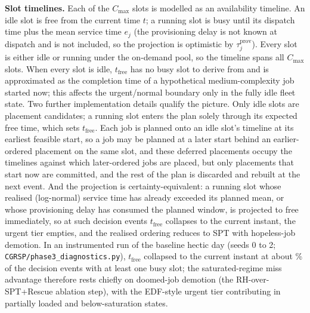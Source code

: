 \textbf{Slot timelines.} Each of the $C_{\max}$ slots is modelled as an availability timeline. An idle slot is free from the current time $t$; a running slot is busy until its dispatch time plus the mean service time $e_j$ (the provisioning delay is not known at dispatch and is not included, so the projection is optimistic by $\tau^{\text{prov}}_j$). Every slot is either idle or running under the on-demand pool, so the timeline spans all $C_{\max}$ slots. When every slot is idle, $t_{\text{free}}$ has no busy slot to derive from and is approximated as the completion time of a hypothetical medium-complexity job started now; this affects the urgent/normal boundary only in the fully idle fleet state. Two further implementation details qualify the picture. Only idle slots are placement candidates; a running slot enters the plan solely through its expected free time, which sets $t_{\text{free}}$. Each job is planned onto an idle slot's timeline at its earliest feasible start, so a job may be planned at a later start behind an earlier-ordered placement on the same slot, and these deferred placements occupy the timelines against which later-ordered jobs are placed, but only placements that start now are committed, and the rest of the plan is discarded and rebuilt at the next event. And the projection is certainty-equivalent: a running slot whose realised (log-normal) service time has already exceeded its planned mean, or whose provisioning delay has consumed the planned window, is projected to free immediately, so at such decision events $t_{\text{free}}$ collapses to the current instant, the urgent tier empties, and the realised ordering reduces to SPT with hopeless-job demotion. In an instrumented run of the baseline hectic day (seeds 0 to 2; \texttt{CGRSP/phase3\_diagnostics.py}), $t_{\text{free}}$ collapsed to the current instant at about \TFreeCollapsedPct\% of the decision events with at least one busy slot; the saturated-regime miss advantage therefore rests chiefly on doomed-job demotion (the RH-over-SPT+Rescue ablation step), with the EDF-style urgent tier contributing in partially loaded and below-saturation states.

